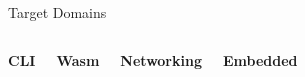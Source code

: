 \begin{frame}{Target Domains}
    \begin{columns}%
        {\bfseries\large CLI}%

        {\bfseries\large Wasm}%

        {\bfseries\large Networking}%

        {\bfseries\large Embedded}%
    \end{columns}%
\end{frame}
